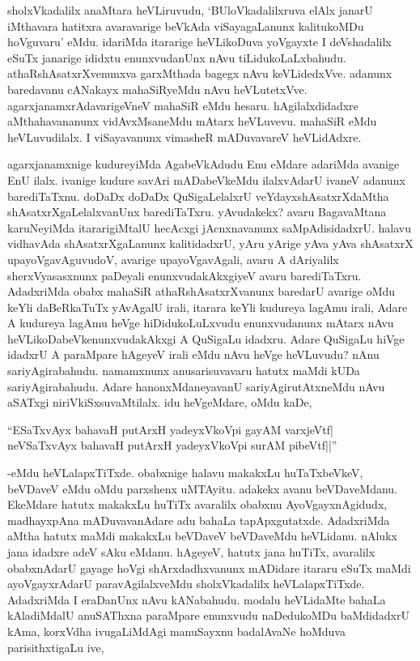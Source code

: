 sholxVkadalilx anaMtara heVLiruvudu, `BUloVkadalilxruva elAlx janarU iMthavara hatitxra avaravarige beVkAda viSayagaLanunx kalitukoMDu hoVguvaru' eMdu. idariMda itararige heVLikoDuva yoVgayxte I deVshadalilx eSuTx janarige ididxtu enunxvudanUnx nAvu tiLidukoLaLxbahudu. athaRshAsatxrXvenunxva garxMthada bagegx nAvu keVLidedxVve. adanunx baredavanu cANakayx mahaSiRyeMdu nAvu heVLutetxVve. agarxjanamxrAdavarigeVneV mahaSiR eMdu hesaru. hAgilalxdidadxre aMthahavananunx vidAvxMsaneMdu mAtarx heVLuvevu. mahaSiR eMdu heVLuvudilalx. I viSayavanunx vimasheR mADuvavareV heVLidAdxre.

agarxjanamxnige kudureyiMda AgabeVkAdudu Enu eMdare adariMda avanige EnU ilalx. ivanige kudure savAri mADabeVkeMdu ilalxvAdarU ivaneV adanunx barediTaTxnu. doDaDx doDaDx QuSigaLelalxrU veYdayxshAsatxrXdaMtha shAsatxrXgaLelalxvanUnx barediTaTxru. yAvudakekx? avaru BagavaMtana karuNeyiMda itararigiMtalU hecAcxgi jAcnxnavanunx saMpAdisidadxrU. halavu vidhavAda shAsatxrXgaLanunx kalitidadxrU, yAru yArige yAva yAva shAsatxrX upayoVgavAguvudoV, avarige upayoVgavAgali, avaru A dAriyalilx sherxVyasasxnunx paDeyali enunxvudakAkxgiyeV avaru barediTaTxru. AdadxriMda obabx mahaSiR athaRshAsatxrXvanunx baredarU avarige oMdu keYli daBeRkaTuTx yAvAgalU irali, itarara keYli kudureya lagAmu irali, Adare A kudureya lagAmu heVge hiDidukoLuLxvudu enunxvudanunx mAtarx nAvu heVLikoDabeVkenunxvudakAkxgi A QuSigaLu idadxru. Adare QuSigaLu hiVge idadxrU A paraMpare hAgeyeV irali eMdu nAvu heVge heVLuvudu? nAnu sariyAgirabahudu. namamxnunx anusarisuvavaru hatutx maMdi kUDa sariyAgirabahudu. Adare hanonxMdaneyavanU sariyAgirutAtxneMdu nAvu aSATxgi niriVkiSxsuvaMtilalx. idu heVgeMdare, oMdu kaDe, 

\begin{shloka}
``ESaTxvAyx bahavaH putArxH yadeyxVkoV\s pi gayAM varxjeVtf|\\
neVSaTxvAyx bahavaH putArxH yadeyxVkoV\s pi surAM pibeVtf||''
\end{shloka}

-eMdu heVLalapxTiTxde. obabxnige halavu makakxLu huTaTxbeVkeV, beVDaveV eMdu oMdu parxshenx uMTAyitu. adakekx avanu beVDaveMdanu. EkeMdare hatutx makakxLu huTiTx avaralilx obabxnu AyoVgayxnAgidudx, madhayxpAna mADuvavanAdare adu bahaLa tapApxgutatxde. AdadxriMda aMtha hatutx maMdi makakxLu beVDaveV beVDaveMdu heVLidanu. nAlukx jana idadxre adeV sAku eMdanu. hAgeyeV, hatutx jana huTiTx, avaralilx obabxnAdarU gayage hoVgi shArxdadhxvanunx mADidare itararu eSuTx maMdi ayoVgayxrAdarU paravAgilalxveMdu sholxVkadalilx heVLalapxTiTxde. AdadxriMda I eraDanUnx nAvu kANabahudu. modalu heVLidaMte bahaLa kAladiMdalU anuSAThxna paraMpare enunxvudu naDedukoMDu baMdidadxrU kAma, korxVdha ivugaLiMdAgi manuSayxnu badalAvaNe hoMduva parisithxtigaLu ive,

